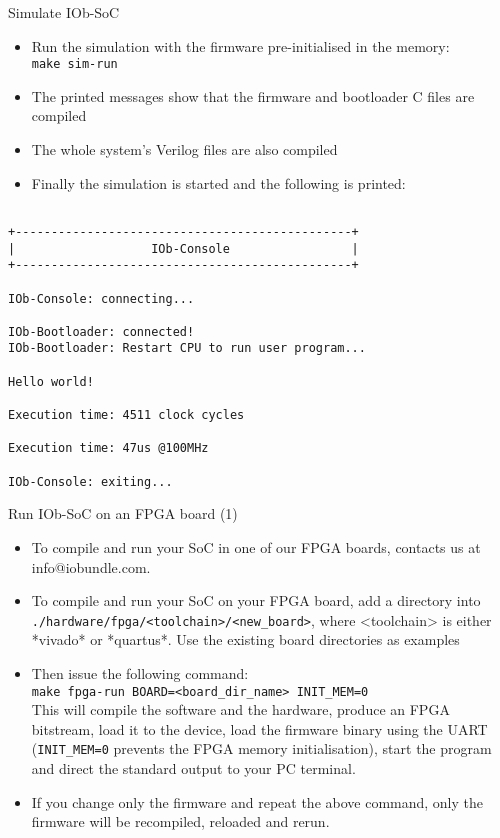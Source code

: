 \documentclass [xcolor=svgnames, t] {beamer}
\begin{document}
\begin{frame}[fragile]{Simulate IOb-SoC}
\begin{itemize}
\item Run the simulation with the firmware pre-initialised in the memory:\\
  {\tt make sim-run}
\item The printed messages show that the firmware and bootloader C files are compiled
\item The whole system's Verilog files are also compiled
\item Finally the simulation is started and the following is printed:
\end{itemize}

\begin{tiny}
  \begin{lstlisting}

+-----------------------------------------------+
|                   IOb-Console                 |
+-----------------------------------------------+

IOb-Console: connecting...

IOb-Bootloader: connected!
IOb-Bootloader: Restart CPU to run user program...

Hello world!

Execution time: 4511 clock cycles

Execution time: 47us @100MHz

IOb-Console: exiting...

  \end{lstlisting}
\end{tiny}
\end{frame}


\begin{frame}{Run IOb-SoC on an FPGA board (1)}
\begin{itemize}
\item To compile and run your SoC in one of our FPGA boards, contacts us at info@iobundle.com.
\item To compile and run your SoC on your FPGA board, add a directory into {\tt ./hardware/fpga/<toolchain>/<new\_board>}, where <toolchain> is either *vivado* or *quartus*. Use the existing board directories as examples
\item Then issue the following command:\\
  {\tt make fpga-run BOARD=<board\_dir\_name> INIT\_MEM=0}\\
  This will compile the software and the hardware, produce an FPGA bitstream,
  load it to the device, load the firmware binary using the UART ({\tt INIT\_MEM=0} prevents the FPGA memory initialisation), start the
  program and direct the standard output to your PC terminal.
\item If you change only the firmware and repeat the above command, only the
  firmware will be recompiled, reloaded and rerun.
\end{itemize}
\end{frame}
\end{document}
